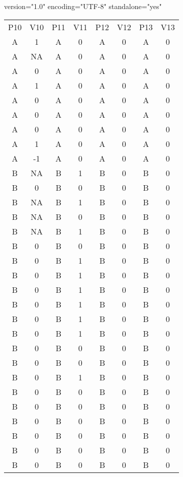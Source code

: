 version="1.0" encoding="UTF-8" standalone="yes" \documentclass{article}
\begin{document}
  \begin{table}

  
  \begin{tabular}{c  c  c  c  c  c  c  c}

  P10 & V10 & P11 & V11 & P12 & V12 & P13 & V13\\
A & 1 & A & 0 & A & 0 & A & 0\\
A & NA & A & 0 & A & 0 & A & 0\\
A & 0 & A & 0 & A & 0 & A & 0\\
A & 1 & A & 0 & A & 0 & A & 0\\
A & 0 & A & 0 & A & 0 & A & 0\\
A & 0 & A & 0 & A & 0 & A & 0\\
A & 0 & A & 0 & A & 0 & A & 0\\
A & 1 & A & 0 & A & 0 & A & 0\\
A & -1 & A & 0 & A & 0 & A & 0\\
B & NA & B & 1 & B & 0 & B & 0\\
B & 0 & B & 0 & B & 0 & B & 0\\
B & NA & B & 1 & B & 0 & B & 0\\
B & NA & B & 0 & B & 0 & B & 0\\
B & NA & B & 1 & B & 0 & B & 0\\
B & 0 & B & 0 & B & 0 & B & 0\\
B & 0 & B & 1 & B & 0 & B & 0\\
B & 0 & B & 1 & B & 0 & B & 0\\
B & 0 & B & 1 & B & 0 & B & 0\\
B & 0 & B & 1 & B & 0 & B & 0\\
B & 0 & B & 1 & B & 0 & B & 0\\
B & 0 & B & 1 & B & 0 & B & 0\\
B & 0 & B & 0 & B & 0 & B & 0\\
B & 0 & B & 0 & B & 0 & B & 0\\
B & 0 & B & 1 & B & 0 & B & 0\\
B & 0 & B & 0 & B & 0 & B & 0\\
B & 0 & B & 0 & B & 0 & B & 0\\
B & 0 & B & 0 & B & 0 & B & 0\\
B & 0 & B & 0 & B & 0 & B & 0\\
B & 0 & B & 0 & B & 0 & B & 0\\
B & 0 & B & 0 & B & 0 & B & 0\\


\end{tabular}


\end{table}
\end{document}

